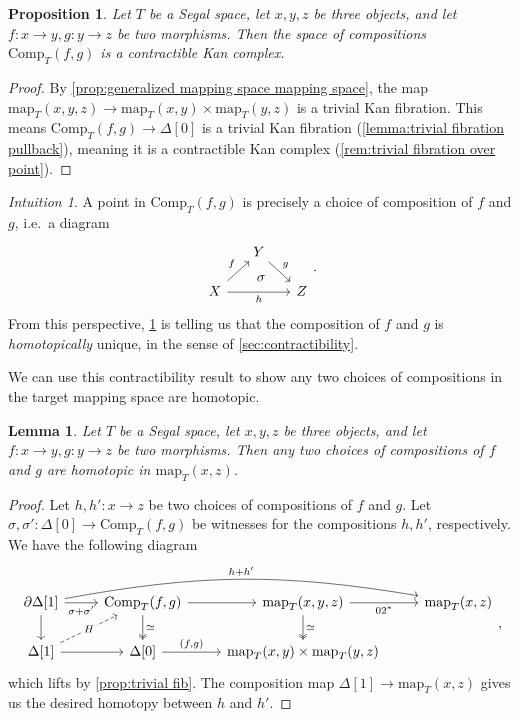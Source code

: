\documentclass[11pt, a4paper]{amsart}
\newcommand{\map}{\mathrm{map}}
\newcommand{\Comp}{\mathrm{Comp}}
\newtheorem{lemma}[equation]{Lemma}
\newtheorem{proposition}[equation]{Proposition}
\theoremstyle{definition}
\theoremstyle{remark}
\newtheorem{intuition}[equation]{Intuition}
\numberwithin{equation}{section}
\begin{document}
\begin{proposition} \label{prop:composition contractible}
  Let $T$ be a Segal space, let $x,y,z$ be three objects, and let $f\colon x \to y, g\colon y \to z$ be two morphisms. Then the space of compositions $\Comp_T(f,g)$ is a contractible Kan complex.
\end{proposition}

\begin{proof}
 By \cref{prop:generalized mapping space mapping space}, the map $\map_T(x,y,z) \to \map_T(x,y) \times \map_T(y,z)$ is a trivial Kan fibration. This means $\Comp_T(f,g) \to \Delta[0]$ is a trivial Kan fibration (\cref{lemma:trivial fibration pullback}), meaning it is a contractible Kan complex (\cref{rem:trivial fibration over point}).
\end{proof}
 
\begin{intuition}
 A point in $\Comp_T(f,g)$ is precisely a choice of composition of $f$ and $g$, i.e.~a diagram
 \[ 
  \begin{tikzcd}[row sep=0.5cm, column sep=0.5cm]
    & Y \arrow[dr, "g"]& \\
    X \arrow[rr, ""{name=U, above}, "h"'] \arrow[ur, "f"] & & Z
    \arrow[start anchor={[xshift=-5ex, yshift=4ex]}, to=U, phantom, "\sigma"]
  \end{tikzcd}.
 \]  
 From this perspective, \cref{prop:composition contractible} is telling us that the composition of $f$ and $g$ is \emph{homotopically} unique, in the sense of \cref{sec:contractibility}.
\end{intuition}

We can use this contractibility result to show any two choices of compositions in the target mapping space are homotopic.

\begin{lemma} \label{lemma:homotopic compositions}
Let $T$ be a Segal space, let $x,y,z$ be three objects, and let $f\colon x \to y, g\colon y \to z$ be two morphisms. 
Then any two choices of compositions of $f$ and $g$ are homotopic in $\map_T(x,z)$.
\end{lemma}

\begin{proof}
Let $h, h' \colon x \to z$ be two choices of compositions of $f$ and $g$. Let $\sigma, \sigma'\colon \Delta[0] \to \Comp_T(f,g)$ be witnesses for the compositions $h,h'$, respectively.
We have the following diagram 
\[ 
\begin{tikzcd}
  \partial \Delta[1] \arrow[rrr, "h + h'", bend left = 10] \arrow[r, " \sigma + \sigma'"'] \arrow[d] & \Comp_T(f,g) \arrow[d, twoheadrightarrow, "\simeq"] \arrow[r] & \map_T(x,y,z) \arrow[r, "02^*"'] \arrow[d, twoheadrightarrow, "\simeq"]  & \map_T(x,z) \\
 \Delta[1] \arrow[r] \arrow[ur, "H" description, dashed] & \Delta[0] \arrow[r, "{(f,g)}"] & \map_T(x,y) \times \map_T(y,z)
\end{tikzcd},
\]
which lifts by \cref{prop:trivial fib}. The composition map $\Delta[1] \to \map_T(x,z)$ gives us the desired homotopy between $h$ and $h'$.
\end{proof}
\end{document}
